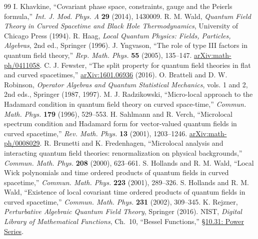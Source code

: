 \begin{thebibliography}{99}
 I. Khavkine, ``Covariant phase space, constraints, gauge and the Peierls formula,'' \emph{Int. J. Mod. Phys. A} \textbf{29} (2014), 1430009.
 R. M. Wald, \emph{Quantum Field Theory in Curved Spacetime and Black Hole Thermodynamics}, University of Chicago Press (1994).
 R. Haag, \emph{Local Quantum Physics: Fields, Particles, Algebras}, 2nd ed., Springer (1996).
 J. Yngvason, ``The role of type III factors in quantum field theory,'' \emph{Rep. Math. Phys.} \textbf{55} (2005), 135--147. \href{https://arxiv.org/abs/math-ph/0411058}{arXiv:math-ph/0411058}.
 C. J. Fewster, ``The split property for quantum field theories in flat and curved spacetimes,'' \href{https://arxiv.org/abs/1601.06936}{arXiv:1601.06936} (2016).
 O. Bratteli and D. W. Robinson, \emph{Operator Algebras and Quantum Statistical Mechanics}, vols. 1 and 2, 2nd eds., Springer (1987, 1997).
 M. J. Radzikowski, ``Micro-local approach to the Hadamard condition in quantum field theory on curved space-time,'' \emph{Commun. Math. Phys.} \textbf{179} (1996), 529--553.
 H. Sahlmann and R. Verch, ``Microlocal spectrum condition and Hadamard form for vector-valued quantum fields in curved spacetime,'' \emph{Rev. Math. Phys.} \textbf{13} (2001), 1203--1246. \href{https://arxiv.org/abs/math-ph/0008029}{arXiv:math-ph/0008029}.
 R. Brunetti and K. Fredenhagen, ``Microlocal analysis and interacting quantum field theories: renormalization on physical backgrounds,'' \emph{Commun. Math. Phys.} \textbf{208} (2000), 623--661.
 S. Hollands and R. M. Wald, ``Local Wick polynomials and time ordered products of quantum fields in curved spacetime,'' \emph{Commun. Math. Phys.} \textbf{223} (2001), 289--326.
 S. Hollands and R. M. Wald, ``Existence of local covariant time ordered products of quantum fields in curved spacetime,'' \emph{Commun. Math. Phys.} \textbf{231} (2002), 309--345.
 K. Rejzner, \emph{Perturbative Algebraic Quantum Field Theory}, Springer (2016).
 NIST, \emph{Digital Library of Mathematical Functions}, Ch.~10, ``Bessel Functions,'' \href{https://dlmf.nist.gov/10.31}{\S10.31: Power Series}.
\end{thebibliography}

